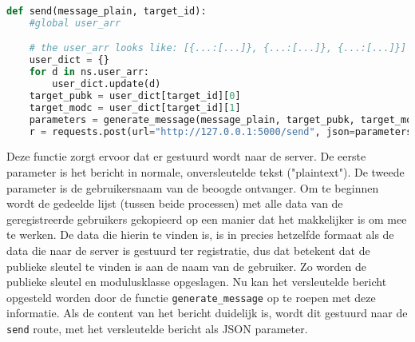 \documentclass{report} %
\let\code\lstinline
\begin{document}
\begin{lstlisting}[language=Python, firstnumber=58, label=send()]
def send(message_plain, target_id):
    #global user_arr

    # the user_arr looks like: [{...:[...]}, {...:[...]}, {...:[...]}] etc. We convert it to {...:[...], ...:[...], ...:[...]}.
    user_dict = {}
    for d in ns.user_arr:
        user_dict.update(d)
    target_pubk = user_dict[target_id][0]
    target_modc = user_dict[target_id][1]
    parameters = generate_message(message_plain, target_pubk, target_modc)
    r = requests.post(url="http://127.0.0.1:5000/send", json=parameters)
\end{lstlisting}
Deze functie zorgt ervoor dat er gestuurd wordt naar de server. De eerste parameter is het bericht in normale, onversleutelde tekst ("plaintext"). De tweede parameter is de gebruikersnaam van de beoogde ontvanger. Om te beginnen wordt de gedeelde lijst (tussen beide processen) met alle data van de geregistreerde gebruikers gekopieerd op een manier dat het makkelijker is om mee te werken. De data die hierin te vinden is, is in precies hetzelfde formaat als de data die naar de server is gestuurd ter registratie, dus dat betekent dat de publieke sleutel te vinden is aan de naam van de gebruiker. Zo worden de publieke sleutel en modulusklasse opgeslagen. Nu kan het versleutelde bericht opgesteld worden door de functie \code{generate_message} op te roepen met deze informatie. Als de content van het bericht duidelijk is, wordt dit gestuurd naar de \code{send} route, met het versleutelde bericht als JSON parameter. \\
\end{document}

